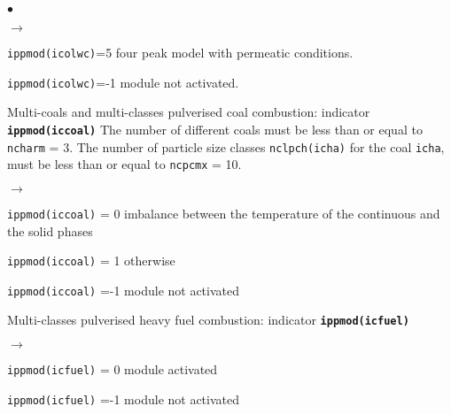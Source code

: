 {{\begin{list}{$\bullet$}{}
\begin{list}{$\rightarrow$}{}
               \item \texttt{ippmod(icolwc)}=5 four peak model with permeatic conditions.
               \item \texttt{ippmod(icolwc)}=-1 module not activated.
          \end{list}
        \item Multi-coals and multi-classes pulverised coal combustion:
              indicator {\bf \tt ippmod(iccoal)}
              The number of different coals must be less than or equal to
              \texttt{ncharm} = 3. The number of particle size
             classes \texttt{nclpch(icha)} for the coal
             \texttt{icha}, must
             be less than or equal to \texttt{ncpcmx} = 10.
         \begin{list}{$\rightarrow$}{}
                \item \texttt{ippmod(iccoal)} = 0 imbalance between the
                      temperature of the continuous and the solid phases
                \item \texttt{ippmod(iccoal)} = 1 otherwise
                \item \texttt{ippmod(iccoal)} =-1 module not activated
         \end{list}

        \item Multi-classes pulverised heavy fuel combustion:
              indicator {\bf \tt ippmod(icfuel)}
         \begin{list}{$\rightarrow$}{}
                \item \texttt{ippmod(icfuel)} = 0 module activated
                \item \texttt{ippmod(icfuel)} =-1 module not activated
         \end{list}


\end{list}}}
